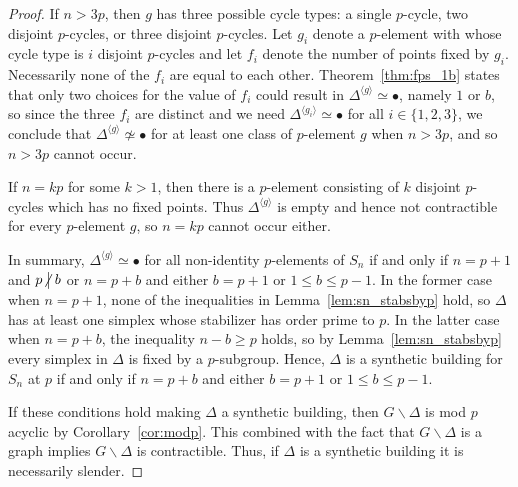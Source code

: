 \documentclass[12pt]{amsart}
\theoremstyle{plain}
\theoremstyle{definition}
\theoremstyle{remark}
\numberwithin{equation}{section}
\newcommand{\notdivide}{\kern-2.1pt\not\kern2.1pt\bigm|}
\newcommand{\bs}{\backslash}
\begin{document}
\begin{proof}
If $n>3p$, then $g$ has three possible cycle types: a single $p$-cycle, two disjoint $p$-cycles, or three disjoint $p$-cycles. Let $g_i$ denote a $p$-element with whose cycle type is $i$ disjoint $p$-cycles and let $f_i$ denote the number of points fixed by $g_i$. Necessarily none of the $f_i$ are equal to each other. Theorem~\ref{thm:fps_1b} states that only two choices for the value of $f_i$ could result in $\Delta^{\langle g\rangle}\simeq \bullet$, namely $1$ or $b$, so since the three $f_i$ are distinct and we need $\Delta^{\langle g_i\rangle}\simeq \bullet$ for all $i\in\{1,2,3\}$, we conclude that $\Delta^{\langle g\rangle}\not\simeq \bullet$ for at least one class of $p$-element $g$ when $n>3p$, and so $n>3p$ cannot occur.

If $n=kp$ for some $k>1$, then there is a $p$-element consisting of $k$ disjoint $p$-cycles which has no fixed points. Thus $\Delta^{\langle g\rangle}$ is empty and hence not contractible for every $p$-element $g$, so $n=kp$ cannot occur either.

In summary, $\Delta^{\langle g\rangle}\simeq \bullet$ for all non-identity $p$-elements of $S_n$ if and only if $n=p+1$ and $p\notdivide b$ or $n=p+b$ and either $b=p+1$ or $1\leq b\leq p-1$. 
In the former case when $n=p+1$, none of the inequalities in Lemma~\ref{lem:sn_stabsbyp} hold, so $\Delta$ has at least one simplex whose stabilizer has order prime to $p$. In the latter case when $n=p+b$, the inequality $n-b\geq p$ holds, so by Lemma~\ref{lem:sn_stabsbyp} every simplex in $\Delta$ is fixed by a $p$-subgroup. Hence, $\Delta$ is a synthetic building for $S_n$ at $p$ if and only if $n=p+b$ and either $b=p+1$ or $1\le b\le p-1$. 

If these conditions hold making $\Delta$ a synthetic building, then $G\bs\Delta$ is mod $p$ acyclic by Corollary~\ref{cor:modp}. This combined with the fact that $G\bs\Delta$ is a graph implies $G\bs\Delta$ is contractible. Thus, if $\Delta$ is a synthetic building it is necessarily slender.
\end{proof}
\end{document}
